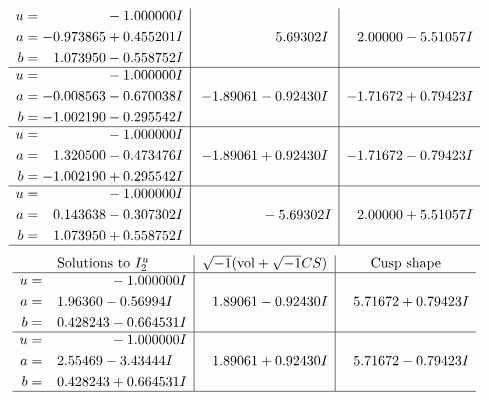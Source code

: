 \documentclass[1p]{elsarticle_modified}
\theoremstyle{definition}
\newcommand{\I}{\sqrt{-1}}
\begin{document}
$$\begin{array}{c|c|c}
\begin{aligned}
u &= \phantom{-0.000000 } -1.000000 I \\
a &= -0.973865 + 0.455201 I \\
b &= \phantom{-}1.073950 - 0.558752 I\end{aligned}
 & \phantom{-0.000000 -}5.69302 I & \phantom{-}2.00000 - 5.51057 I \\ \hline\begin{aligned}
u &= \phantom{-0.000000 } -1.000000 I \\
a &= -0.008563 - 0.670038 I \\
b &= -1.002190 - 0.295542 I\end{aligned}
 & -1.89061 - 0.92430 I & -1.71672 + 0.79423 I \\ \hline\begin{aligned}
u &= \phantom{-0.000000 } -1.000000 I \\
a &= \phantom{-}1.320500 - 0.473476 I \\
b &= -1.002190 + 0.295542 I\end{aligned}
 & -1.89061 + 0.92430 I & -1.71672 - 0.79423 I \\ \hline\begin{aligned}
u &= \phantom{-0.000000 } -1.000000 I \\
a &= \phantom{-}0.143638 - 0.307302 I \\
b &= \phantom{-}1.073950 + 0.558752 I\end{aligned}
 & \phantom{-0.000000 } -5.69302 I & \phantom{-}2.00000 + 5.51057 I\\
 \hline 
 \end{array}$$\newpage$$\begin{array}{c|c|c}  
\text{Solutions to }I^u_{2}& \I (\text{vol} + \sqrt{-1}CS) & \text{Cusp shape}\\
 \hline 
\begin{aligned}
u &= \phantom{-0.000000 } -1.000000 I \\
a &= \phantom{-}1.96360 - 0.56994 I \\
b &= \phantom{-}0.428243 - 0.664531 I\end{aligned}
 & \phantom{-}1.89061 - 0.92430 I & \phantom{-}5.71672 + 0.79423 I \\ \hline\begin{aligned}
u &= \phantom{-0.000000 } -1.000000 I \\
a &= \phantom{-}2.55469 - 3.43444 I \\
b &= \phantom{-}0.428243 + 0.664531 I\end{aligned}
 & \phantom{-}1.89061 + 0.92430 I & \phantom{-}5.71672 - 0.79423 I\\
 \hline 
 \end{array}$$\newpage\newpage\renewcommand{\arraystretch}{1}
\end{document}
